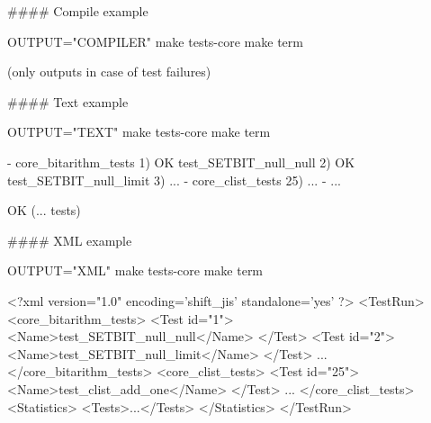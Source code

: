 \#\#\#\# Compile example 
\begin{DoxyCode}
OUTPUT="COMPILER" make tests-core
make term
\end{DoxyCode}


(only outputs in case of test failures)

\#\#\#\# Text example 
\begin{DoxyCode}
OUTPUT="TEXT" make tests-core
make term
\end{DoxyCode}



\begin{DoxyCode}
- core\_bitarithm\_tests
1) OK test\_SETBIT\_null\_null
2) OK test\_SETBIT\_null\_limit
3) ...
- core\_clist\_tests
25) ...
- ...

OK (... tests)
\end{DoxyCode}


\#\#\#\# X\+ML example 
\begin{DoxyCode}
OUTPUT="XML" make tests-core
make term
\end{DoxyCode}



\begin{DoxyCode}
<?\textcolor{keyword}{xml} \textcolor{keyword}{version}=\textcolor{stringliteral}{"1.0"} \textcolor{keyword}{encoding}=\textcolor{stringliteral}{'shift\_jis'} \textcolor{keyword}{standalone}=\textcolor{stringliteral}{'yes'} ?>
<\textcolor{keywordtype}{TestRun}>
<\textcolor{keywordtype}{core\_bitarithm\_tests}>
<\textcolor{keywordtype}{Test} \textcolor{keyword}{id}=\textcolor{stringliteral}{"1"}>
<\textcolor{keywordtype}{Name}>\textcolor{keyword}{test\_SETBIT\_null\_null}</\textcolor{keywordtype}{Name}>
</\textcolor{keywordtype}{Test}>
<\textcolor{keywordtype}{Test} \textcolor{keyword}{id}=\textcolor{stringliteral}{"2"}>
<\textcolor{keywordtype}{Name}>\textcolor{keyword}{test\_SETBIT\_null\_limit}</\textcolor{keywordtype}{Name}>
</\textcolor{keywordtype}{Test}>
...
</\textcolor{keywordtype}{core\_bitarithm\_tests}>
<\textcolor{keywordtype}{core\_clist\_tests}>
<\textcolor{keywordtype}{Test} \textcolor{keyword}{id}=\textcolor{stringliteral}{"25"}>
<\textcolor{keywordtype}{Name}>\textcolor{keyword}{test\_clist\_add\_one}</\textcolor{keywordtype}{Name}>
</\textcolor{keywordtype}{Test}>
...
</\textcolor{keywordtype}{core\_clist\_tests}>
<\textcolor{keywordtype}{Statistics}>
<\textcolor{keywordtype}{Tests}>...</\textcolor{keywordtype}{Tests}>
</\textcolor{keywordtype}{Statistics}>
</\textcolor{keywordtype}{TestRun}>
\end{DoxyCode}


